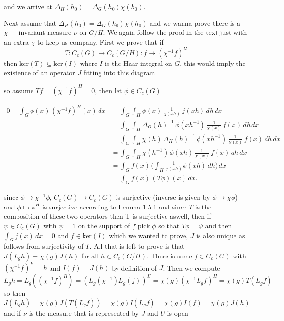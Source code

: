 \documentclass{article}
\begin{document}
and we arrive at $\Delta_H(h_0) = \Delta_G(h_0)\chi(h_0)$. 

Next assume that $\Delta_H(h_0) = \Delta_G(h_0)\chi(h_0)$ and we wanna prove there is a $\chi-$ invariant measure $\nu$ on $G/H$. We again follow the proof in the text just with an extra $\chi$ to keep us company. First we prove that if 
$$T: C_c(G) \rightarrow C_c(G/H):f \rightarrow (\chi^{-1}f)^H$$ 
then $\text{ker}(T) \subseteq \text{ker}(I)$ where $I$ is the Haar integral on $G$, this would imply the existence of an operator $J$ fitting into this diagram

\vspace{0.3cm}

\begin{center}
\end{center}


\vspace{0.3cm}

so assume $Tf = (\chi^{-1}f)^H = 0$, then let $\phi \in C_c(G)$

\begin{align*}
0 = \int_G \phi(x)\,(\chi^{-1}f)^H(x)\,dx 
  & = \int_G \int_H \phi(x)\,\frac{1}{\chi(xh)}\,f(xh)\,dh\,dx \\[0.3em]
  &= \int_G \int_H \Delta_G(h)^{-1}\,\phi(xh^{-1})\,\frac{1}{\chi(x)}\,f(x)\,dh\,dx \\[0.3em]
  &= \int_G \int_H \chi(h)\,\Delta_H(h)^{-1}\,\phi(xh^{-1})\,\frac{1}{\chi(x)}\,f(x)\,dh\,dx \\[0.3em]
  &= \int_G \int_H \chi(h^{-1})\,\phi(xh)\,\frac{1}{\chi(x)}\,f(x)\,dh\,dx \\[0.3em]
  &= \int_G f(x)\,\Big(\int_H \frac{1}{\chi(xh)}\phi(xh)\,dh\Big)\,dx \\[0.3em]
  &= \int_G f(x)\,(T\phi)(x)\,dx.
\end{align*}

since $\phi \mapsto\chi^{-1}\phi$, $C_c(G) \rightarrow C_c(G)$ is surjective (inverse is given by $\phi \rightarrow \chi \phi$) and $\phi \mapsto \phi^H$ is surjective according to Lemma 1.5.1 and since $T$ is the composition of these two operators then T is surjective aswell, then if $\psi \in C_c(G)$ with $\psi = 1$ on the support of $f$ pick $\phi$ so that $T\phi = \psi$ and then $\int_G f(x) \ dx = 0$ and $f \in \text{ker}(I)$ which we wanted to prove, $J$ is also unique as follows from surjectivity of $T$. All that is left to prove is that $J(L_gh) = \chi(g)J(h)$ for all $h \in C_c(G/H)$.
There is some $f \in C_c(G)$ with $(\chi^{-1}f)^H = h$ and $I(f) = J(h)$ by definition of $J$. Then we compute 
$$L_gh = L_g((\chi^{-1}f)^H) = (L_g(\chi^{-1})L_g(f))^H = \chi(g) (\chi^{-1}L_gf)^H = \chi(g) T(L_gf)$$
so then 
$$J(L_gh) = \chi(g) J(T(L_gf)) = \chi(g) I(L_gf) = \chi(g) I(f) = \chi(g) J(h)$$
and if $\nu$ is the measure that is represented by $J$ and $U$ is open
\end{document}
